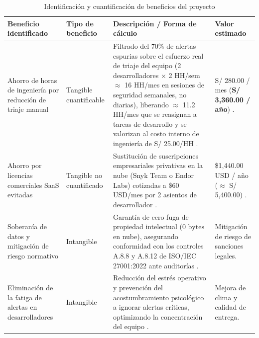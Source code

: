 \begin{table}[H]
\centering
\caption{Identificación y cuantificación de beneficios del proyecto}
\label{tab:beneficios_proyecto}
\small
{}
\begin{tabularx}{\textwidth}{>{\raggedright\arraybackslash}p{3.8cm} >{\raggedright\arraybackslash}p{3.0cm} X >{\raggedleft\arraybackslash}p{2.6cm}}
\toprule
\textbf{Beneficio identificado} & \textbf{Tipo de beneficio} & \textbf{Descripción / Forma de cálculo} & \textbf{Valor estimado} \\
\midrule
Ahorro de horas de ingeniería por reducción de triaje manual & 
Tangible cuantificable & 
Filtrado del 70\% de alertas espurias sobre el esfuerzo real de triaje del equipo (2 desarrolladores $\times$ 2 HH/sem $\approx$ 16 HH/mes en sesiones de seguridad semanales, no diarias), liberando $\approx$ 11.2 HH/mes que se reasignan a tareas de desarrollo y se valorizan al costo interno de ingeniería de S/ 25.00/HH \parencite{pashchenko2022vuln4real}. & 
S/ 280.00 / mes \newline (\textbf{S/ 3,360.00 / año}) \parencite{torres2026proyecto}. \\ %
\addlinespace
Ahorro por licencias comerciales SaaS evitadas & 
Tangible no cuantificado & 
Sustitución de suscripciones empresariales privativas en la nube (Snyk Team o Endor Labs) cotizadas a \$60 USD/mes por 2 asientos de desarrollador \parencite{endorlabs2023state}. & 
\$1,440.00 USD / año \newline ($\approx$ S/ 5,400.00) \parencite{gutierrez2024auditoria}. \\ %
\addlinespace
Soberanía de datos y mitigación de riesgo normativo & 
Intangible & 
Garantía de cero fuga de propiedad intelectual ($0\text{ bytes}$ en nube), asegurando conformidad con los controles A.8.8 y A.8.12 de ISO/IEC 27001:2022 ante auditorías \parencite{ladisa2023sok}. & 
Mitigación de riesgo de sanciones legales. \\ %
\addlinespace
Eliminación de la fatiga de alertas en desarrolladores & 
Intangible & 
Reducción del estrés operativo y prevención del acostumbramiento psicológico a ignorar alertas críticas, optimizando la concentración del equipo \parencite{sadowski2018lessons}. & 
Mejora de clima y calidad de entrega. \\ %
\bottomrule
\end{tabularx}
\end{table}

